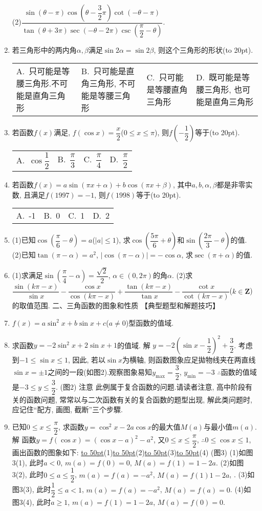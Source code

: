 \documentclass[10pt,a4paper]{article}
\newcommand{\blank}[1]{\underline{\hbox to #1pt{}}}
\newcommand{\bracket}[1]{(\hbox to #1pt{})}
\newcommand{\fourch}[4]{\par\begin{tabular}{p{.23\textwidth}p{.23\textwidth}p{.23\textwidth}p{.23\textwidth}}
A.~#1 &B.~#2& C.~#3& D.~#4
\end{tabular}}
\begin{document}
\begin{enumerate}[1.]
(2)$\dfrac{\sin (\theta -\pi)\cos (\theta -\dfrac 32\pi)\cot (-\theta -\pi)}{\tan (\theta +3\pi)\sec (-\theta -2\pi)\csc (\dfrac{\pi }2-\theta)}$.
\item 若三角形中的两内角$\alpha ,\beta$满足$\sin 2\alpha =\sin 2\beta$, 则这个三角形的形状\bracket{20}.
\fourch{只可能是等腰三角形.不可能是直角三角形}{只可能是直角三角形, 不可能是等腰三角形}{只可能是等腰直角三角形}{既可能是等腰三角形, 也可能是直角三角形}
\item 若函数$f(x)$满足, $f(\cos x)=\dfrac x2$($0\le x\le \pi$), 则$f(-\dfrac 12)$等于\bracket{20}.
\fourch{$\cos \dfrac 12$}{$\dfrac{\pi }3$}{$\dfrac{\pi }4$}{$\dfrac{\pi }2$}
\item 若函数$f(x)=a\sin (\pi x+\alpha)+b\cos (\pi x+\beta)$, 其中$a,b,\alpha ,\beta$都是非零实数, 且满足$f(1997)=-1$, 则$f(1998)$等于\bracket{20}.
\fourch{-1}{0}{1}{2}
\item (1)已知$\cos (\dfrac{\pi }6-\theta)=a$($|a|\le 1$), 求$\cos (\dfrac{5\pi }6+\theta)$和$\sin (\dfrac{2\pi }3-\theta)$的值.
(2)已知$\tan (\pi -\alpha)=a^2$, $|\cos (\pi -\alpha)|=-\cos \alpha$, 求$\sec (\pi +\alpha)$的值.
\item (1)求满足$\sin (\dfrac{\pi }4-\alpha)=\dfrac{\sqrt 2}2$, $\alpha \in (0,2\pi)$的角$\alpha$.
(2)求$\dfrac{\sin (k\pi -x)}{\sin x}-\dfrac{\cos x}{\cos (k\pi -x)}+\dfrac{\tan (k\pi -x)}{\tan x}-\dfrac{\cot x}{\cot (k\pi -x)}$($k\in \mathbf{Z}$)的取值范围.
二、三角函数的图象和性质
【典型题型和解题技巧】
\item $f(x)=a\sin ^2x+b\sin x+c$($a\ne 0$)型函数的值域.
\item 求函数$y=-2\sin ^2x+2\sin x+1$的值域.
解  $y=-2(\sin x-\dfrac 12)^2+\dfrac 32$.
考虑到$-1\le \sin x\le 1$, 因此, 若以$\sin x$为横轴, 则函数图象应足拋物线夹在两直线$\sin x=\pm 1$之间的一段(如图2).观察图象易知$y_{\max }=\dfrac 32$, $y_{\min }=-3$
$\therefore$函数的值域是$-3\le y\le \dfrac 32$.
(图2)
注意  此例属于复合函数的问题.请读者注意, 高中阶段有关的函数问题, 常常以与二次函数有关的复合函数的题型出现, 解此类问题时, 应记住``配方, 画图, 截断''三个步驟.
\item 已知$0\le x\le \dfrac{\pi }2$, 求函数$y=\cos ^2x-2a\cos x$的最大值$M(a)$与最小值$m(a)$.
解  函数$y=f(\cos x)=(\cos x-a)^2-a^2$, 又$0\le x\le \dfrac{\pi }2$,
$\therefore 0\le \cos x\le 1$, 画出函数的图象如下:
\blank{50}(1)\blank{50}(2)\blank{50}(3)\blank{50}(4)
(图3)
(1)如图3(1), 此时$a<0$, $m(a)=f(0)=0$, $M(a)=f(1)=1-2a$.
(2)如图3(2), 此时$0\le a\le \dfrac 12$, $m(a)=f(a)=-a^2$, $M(a)=f(1)1-2a$, .
(3)如图3(3), 此时$\dfrac 12\le a<1$, $m(a)=f(a)=-a^2$, $M(a)=f(a)=0$.
(4)如图3(4), 此时$a\ge 1$, $m(a)=f(1)=1-2a$, $M(a)=f(0)=0$.

\end{enumerate}
\end{document}
